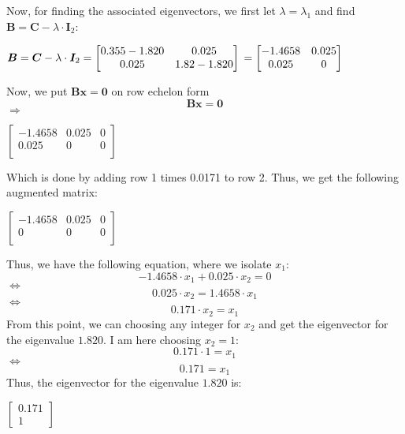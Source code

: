\documentclass{report}
\begin{document}
Now, for finding the associated eigenvectors, we first let $\lambda = \lambda_1$ and find $\bm{B} = \bm{C} - \lambda \cdot \bm{I}_2$:
\begin{center}
    \begin{math}
        \bm{B} = \bm{C} - \lambda \cdot \bm{I}_2 =
        \begin{bmatrix}
            0.355 - 1.820 & 0.025 \\
            0.025 & 1.82 - 1.820
        \end{bmatrix}
        \newline =
        \begin{bmatrix}
            -1.4658 & 0.025 \\
            0.025 & 0 \\
        \end{bmatrix}
    \end{math}
\end{center}
Now, we put $\bm{B} \bm{x} = \bm{0}$ on row echelon form
$$\bm{B} \bm{x} = \bm{0}$$
$\Rightarrow$
\begin{center}
    \begin{math}
        \left[
            \begin{array}{cc|c}
                -1.4658 & 0.025 & 0 \\
                0.025 & 0 & 0 \\
            \end{array}
        \right]
    \end{math}
\end{center}
Which is done by adding row 1 times 0.0171 to row 2. Thus, we get the following augmented matrix:
\begin{center}
    \begin{math}
        \left[
            \begin{array}{cc|c}
                -1.4658 & 0.025 & 0 \\
                0 & 0 & 0 \\
            \end{array}
        \right]
    \end{math}
\end{center}
Thus, we have the following equation, where we isolate $x_1$:
$$-1.4658 \cdot x_1 + 0.025 \cdot x_2 = 0$$
$\Leftrightarrow$
$$0.025 \cdot x_2 = 1.4658 \cdot x_1$$
$\Leftrightarrow$
$$0.171 \cdot x_2 = x_1$$
From this point, we can choosing any integer for $x_2$ and get the eigenvector for the eigenvalue $1.820$. I am here choosing $x_2 = 1$:
$$0.171 \cdot 1 = x_1$$
$\Leftrightarrow$
$$0.171 = x_1$$
Thus, the eigenvector for the eigenvalue $1.820$ is:
\begin{center}
    \begin{math}
        \left[
            \begin{array}{c}
                0.171 \\
                1
            \end{array}
        \right]
    \end{math}
\end{center}
\end{document}
